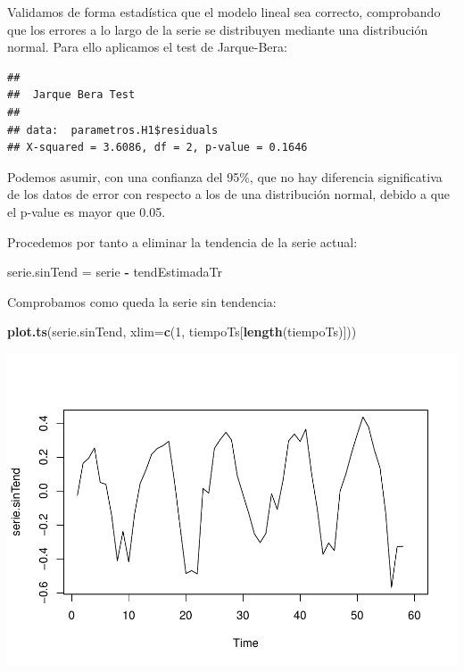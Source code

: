 \documentclass[]{article}
\newenvironment{Shaded}{\begin{snugshade}}{\end{snugshade}}
\newcommand{\KeywordTok}[1]{\textcolor[rgb]{0.13,0.29,0.53}{\textbf{#1}}}
\newcommand{\DataTypeTok}[1]{\textcolor[rgb]{0.13,0.29,0.53}{#1}}
\newcommand{\DecValTok}[1]{\textcolor[rgb]{0.00,0.00,0.81}{#1}}
\newcommand{\StringTok}[1]{\textcolor[rgb]{0.31,0.60,0.02}{#1}}
\newcommand{\OperatorTok}[1]{\textcolor[rgb]{0.81,0.36,0.00}{\textbf{#1}}}
\newcommand{\NormalTok}[1]{#1}
\begin{document}
Validamos de forma estadística que el modelo lineal sea correcto,
comprobando que los errores a lo largo de la serie se distribuyen
mediante una distribución normal. Para ello aplicamos el test de
Jarque-Bera:

\begin{Shaded}
\end{Shaded}

\begin{verbatim}
## 
##  Jarque Bera Test
## 
## data:  parametros.H1$residuals
## X-squared = 3.6086, df = 2, p-value = 0.1646
\end{verbatim}

Podemos asumir, con una confianza del 95\%, que no hay diferencia
significativa de los datos de error con respecto a los de una
distribución normal, debido a que el p-value es mayor que 0.05.

Procedemos por tanto a eliminar la tendencia de la serie actual:

\begin{Shaded}
\begin{Highlighting}[]
\NormalTok{serie.sinTend =}\StringTok{ }\NormalTok{serie }\OperatorTok{-}\StringTok{ }\NormalTok{tendEstimadaTr}
\end{Highlighting}
\end{Shaded}

Comprobamos como queda la serie sin tendencia:

\begin{Shaded}
\begin{Highlighting}[]
\KeywordTok{plot.ts}\NormalTok{(serie.sinTend, }\DataTypeTok{xlim=}\KeywordTok{c}\NormalTok{(}\DecValTok{1}\NormalTok{, tiempoTs[}\KeywordTok{length}\NormalTok{(tiempoTs)])) }
\end{Highlighting}
\end{Shaded}

\includegraphics{timeSeries_files/figure-latex/unnamed-chunk-17-1.pdf}
\end{document}

